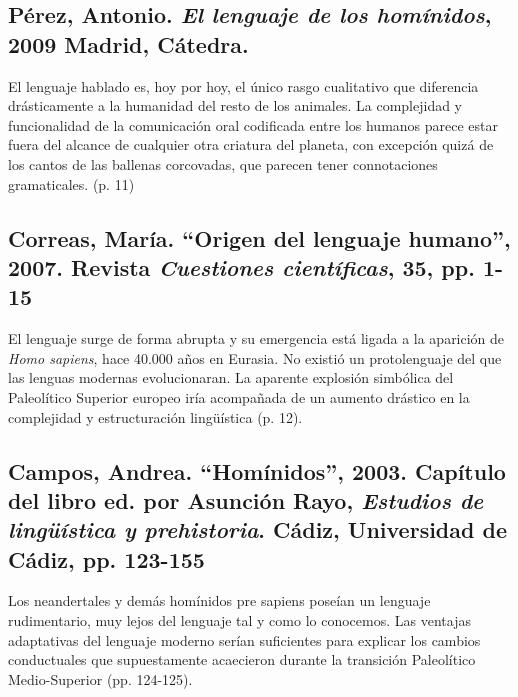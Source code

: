 \documentclass[12pt, a4paper, oneside]{report}
\begin{document}
                \subsection*{Pérez, Antonio. \textit{El lenguaje de los homínidos}, 2009 Madrid, Cátedra.}
                    El lenguaje hablado es, hoy por hoy, el único rasgo cualitativo que diferencia
                    drásticamente a la humanidad del resto de los animales. La complejidad y funcionalidad de
                    la comunicación oral codificada entre los humanos parece estar fuera del alcance de
                    cualquier otra criatura del planeta, con excepción quizá de los cantos de las ballenas
                    corcovadas, que parecen tener connotaciones gramaticales. (p. 11)

                \subsection*{Correas, María. “Origen del lenguaje humano”, 2007. Revista \textit{Cuestiones
                científicas}, 35, pp. 1-15}
                    El lenguaje surge de forma abrupta y su emergencia está ligada a la aparición de \emph{
                    Homo sapiens}, hace 40.000 años en Eurasia. No existió un protolenguaje del que las
                    lenguas modernas evolucionaran. La aparente explosión simbólica del Paleolítico Superior
                    europeo iría acompañada de un aumento drástico en la complejidad y estructuración
                    lingüística (p. 12).

                \subsection*{Campos, Andrea. “Homínidos”, 2003. Capítulo del libro ed. por Asunción Rayo,
                \textit{Estudios de lingüística y prehistoria}. Cádiz, Universidad de Cádiz, pp. 123-155}
                    Los neandertales y demás homínidos pre sapiens poseían un lenguaje rudimentario, muy lejos
                    del lenguaje tal y como lo conocemos. Las ventajas adaptativas del lenguaje moderno serían
                    suficientes para explicar los cambios conductuales que supuestamente acaecieron durante la
                    transición Paleolítico Medio-Superior (pp. 124-125).
\end{document}
